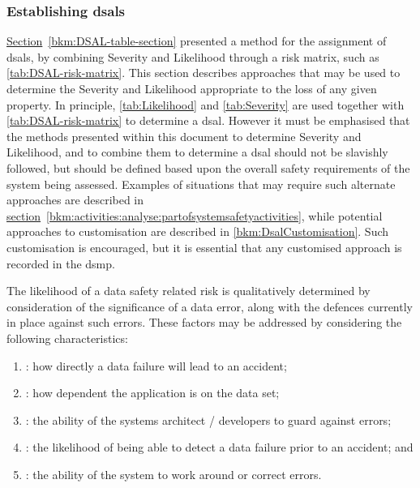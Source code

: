 \subsubsection{Establishing \glspl{dsal}}
\label{bkm:Establishing-DSALS}
\hyperref[bkm:DSAL-table-section]{Section}~\ref{bkm:DSAL-table-section} %
presented a method for the assignment of \gls{dsal}s, by combining Severity and Likelihood through a risk matrix, such as \autoref{tab:DSAL-risk-matrix}. This section describes approaches that may be used to determine the Severity and Likelihood appropriate to the loss of any given property. In principle, \autoref {tab:Likelihood} and \autoref{tab:Severity} are used together with \autoref{tab:DSAL-risk-matrix} to determine a \gls{dsal}. However it must be emphasised that the methods presented within this document to determine Severity and Likelihood, and to combine them to determine a \gls{dsal} should not be slavishly followed, but should be defined based upon the overall safety requirements of the system being assessed. Examples of situations that may require such alternate approaches are described in
\hyperref[bkm:activities:analyse:partofsystemsafetyactivities]{section}~\ref{bkm:activities:analyse:partofsystemsafetyactivities}, %
while potential approaches to customisation are described in \autoref{bkm:DsalCustomisation}.
Such customisation is encouraged, but it is essential that any customised approach is recorded in the \gls{dsmp}.

The likelihood of a data safety related risk is qualitatively determined by
consideration of the significance of a \gls{data error}, along with the defences currently in place against such errors. These factors may be addressed by
considering the following characteristics:

\begin{enumerate}
  \item {}: how directly a data failure will lead to an accident;
  \item {}: how dependent the application is on the data set;
  \item {}: the ability of the systems architect / developers to guard against \cbstart\glspl{error}\cbend;
  \item {}: the likelihood of being able to detect a data failure prior to an accident; and
  \item {}: the ability of the system to work around or correct \cbstart\glspl{error}\cbend.
\end{enumerate}


